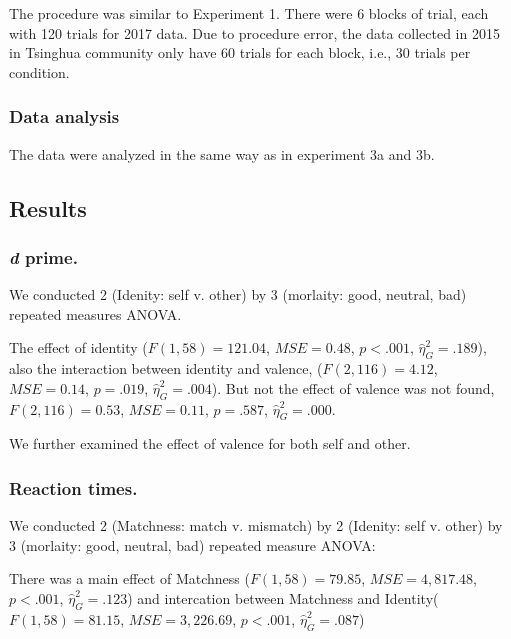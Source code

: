 \documentclass[man]{apa6}
\begin{document}
The procedure was similar to Experiment 1. There were 6 blocks of trial, each with 120 trials for 2017 data. Due to procedure error, the data collected in 2015 in Tsinghua community only have 60 trials for each block, i.e., 30 trials per condition.

\hypertarget{data-analysis-6}{%
\subsubsection{Data analysis}\label{data-analysis-6}}

The data were analyzed in the same way as in experiment 3a and 3b.

\hypertarget{results-6}{%
\subsection{Results}\label{results-6}}

\hypertarget{d-prime.}{%
\subsubsection{\texorpdfstring{\emph{d} prime.}{d prime.}}\label{d-prime.}}

We conducted 2 (Idenity: self v. other) by 3 (morlaity: good, neutral, bad) repeated measures ANOVA.

The effect of identity (\(F(1, 58) = 121.04\), \(\mathit{MSE} = 0.48\), \(p < .001\), \(\hat{\eta}^2_G = .189\)), also the interaction between identity and valence, (\(F(2, 116) = 4.12\), \(\mathit{MSE} = 0.14\), \(p = .019\), \(\hat{\eta}^2_G = .004\)). But not the effect of valence was not found, \(F(2, 116) = 0.53\), \(\mathit{MSE} = 0.11\), \(p = .587\), \(\hat{\eta}^2_G = .000\).

We further examined the effect of valence for both self and other.

\hypertarget{reaction-times.}{%
\subsubsection{Reaction times.}\label{reaction-times.}}

We conducted 2 (Matchness: match v. mismatch) by 2 (Idenity: self v. other) by 3 (morlaity: good, neutral, bad) repeated measure ANOVA:

There was a main effect of Matchness (\(F(1, 58) = 79.85\), \(\mathit{MSE} = 4,817.48\), \(p < .001\), \(\hat{\eta}^2_G = .123\)) and intercation between Matchness and Identity(\(F(1, 58) = 81.15\), \(\mathit{MSE} = 3,226.69\), \(p < .001\), \(\hat{\eta}^2_G = .087\))
\end{document}
